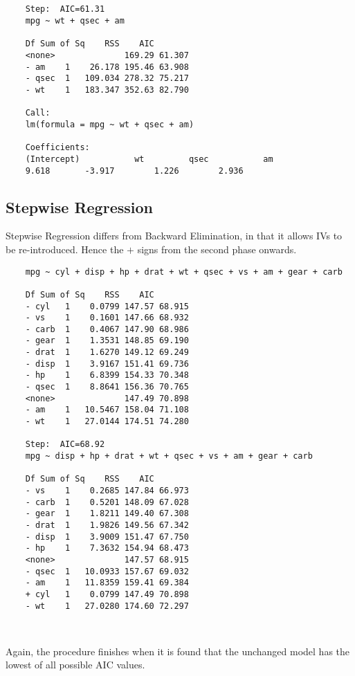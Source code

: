 \documentclass[a4paper,12pt]{article}
\begin{document}
\begin{framed}
	\begin{verbatim}
	
	
	Step:  AIC=61.31
	mpg ~ wt + qsec + am
	
	Df Sum of Sq    RSS    AIC
	<none>              169.29 61.307
	- am    1    26.178 195.46 63.908
	- qsec  1   109.034 278.32 75.217
	- wt    1   183.347 352.63 82.790
	
	Call:
	lm(formula = mpg ~ wt + qsec + am)
	
	Coefficients:
	(Intercept)           wt         qsec           am
	9.618       -3.917        1.226        2.936
	\end{verbatim}
\end{framed}
\subsection{Stepwise Regression}
Stepwise Regression differs from Backward Elimination, in that it allows IVs to be re-introduced. Hence the $+$ signs from the second phase onwards.
\begin{framed}
	\begin{verbatim}
	mpg ~ cyl + disp + hp + drat + wt + qsec + vs + am + gear + carb
	
	Df Sum of Sq    RSS    AIC
	- cyl   1    0.0799 147.57 68.915
	- vs    1    0.1601 147.66 68.932
	- carb  1    0.4067 147.90 68.986
	- gear  1    1.3531 148.85 69.190
	- drat  1    1.6270 149.12 69.249
	- disp  1    3.9167 151.41 69.736
	- hp    1    6.8399 154.33 70.348
	- qsec  1    8.8641 156.36 70.765
	<none>              147.49 70.898
	- am    1   10.5467 158.04 71.108
	- wt    1   27.0144 174.51 74.280
	
	Step:  AIC=68.92
	mpg ~ disp + hp + drat + wt + qsec + vs + am + gear + carb
	
	Df Sum of Sq    RSS    AIC
	- vs    1    0.2685 147.84 66.973
	- carb  1    0.5201 148.09 67.028
	- gear  1    1.8211 149.40 67.308
	- drat  1    1.9826 149.56 67.342
	- disp  1    3.9009 151.47 67.750
	- hp    1    7.3632 154.94 68.473
	<none>              147.57 68.915
	- qsec  1   10.0933 157.67 69.032
	- am    1   11.8359 159.41 69.384
	+ cyl   1    0.0799 147.49 70.898
	- wt    1   27.0280 174.60 72.297
	
	
	\end{verbatim}
\end{framed}
Again, the procedure finishes when it is found that the unchanged model has the lowest of all possible AIC values.
\end{document}
